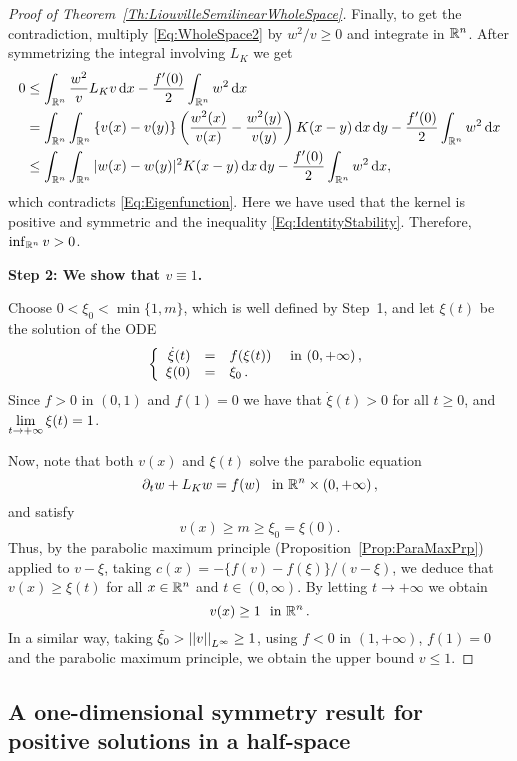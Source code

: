 \begin{proof}[Proof of Theorem~\ref{Th:LiouvilleSemilinearWholeSpace}]
Finally, to get the contradiction, multiply \eqref{Eq:WholeSpace2} by $w^2/v\geq 0$ and integrate in $\mathbb{R}^n$. After symmetrizing the integral involving $L_K$ we get
\begin{align*}
0 &\leq \int_{\mathbb{R}^n} \frac{w^2}{v}  L_K v \,\mathrm{d} x - \frac{f'(0)}{2}\int_{\mathbb{R}^n} w^2 \,\mathrm{d} x \\
&= \int_{\mathbb{R}^n}\int_{\mathbb{R}^n}\left\{ v(x)-v(y) \right\} \left( \frac{w^2(x)}{v(x)}-\frac{w^2(y)}{v(y)} \right) K(x-y) \,\mathrm{d} x \,\mathrm{d} y - \frac{f'(0)}{2}\int_{\mathbb{R}^n} w^2 \,\mathrm{d} x \\
&\leq \int_{\mathbb{R}^n}\int_{\mathbb{R}^n} |w(x)-w(y)|^2 K(x-y) \,\mathrm{d} x \,\mathrm{d} y - \frac{f'(0)}{2}\int_{\mathbb{R}^n} w^2 \,\mathrm{d} x ,
\end{align*}
which contradicts \eqref{Eq:Eigenfunction}. Here we have used that the kernel is positive and symmetric and the inequality \eqref{Eq:IdentityStability}. Therefore, $\inf_{\mathbb{R}^n} v >0$.

\textbf{Step 2: We show that $v\equiv 1$.}

Choose $0<\xi_0<\min\{1,m\}$, which is well defined by Step~1, and let $\xi(t)$ be the solution of the ODE
$$
\left\{\begin{array}{rcll}
\dot{\xi}(t) &=& f(\xi(t)) & \textrm{ in }(0,+\infty)\,,\\
\xi(0) &=& \xi_0\,.
\end{array} \right.
$$
Since $f>0$ in $(0,1)$ and $f(1) = 0$ we have that $\dot{\xi}(t)>0$ for all $t\geq 0$, and $\displaystyle \lim_{t\to +\infty} \xi(t) = 1$.

Now, note that both $v(x)$ and $\xi(t)$ solve the parabolic equation
$$ \partial_t w + L_K w = f(w) \,\,\, \textrm{ in }\mathbb{R}^n\times (0,+\infty)\,, $$
and satisfy
$$ v(x) \geq m \geq \xi_0 = \xi(0). $$
Thus, by the parabolic maximum principle (Proposition~\ref{Prop:ParaMaxPrp}) applied to $v-\xi$, taking $c(x) = -\{f(v)-f(\xi)\}/(v-\xi)$, we deduce that $v(x)\geq \xi(t)$ for all $x\in\mathbb{R}^n$ and $t\in(0,\infty)$. By letting $t \to +\infty$ we obtain
$$
 v(x) \geq 1 \,\, \textrm{ in }\mathbb{R}^n\,.  
$$
In a similar way, taking $\tilde{\xi}_0>\left | \left |{v} \right | \right |_{L^\infty} \geq 1$, using $f<0$ in $(1,+\infty)$, $f(1)=0$ and the parabolic maximum principle, we obtain the upper bound $v\leq 1$.
\end{proof}



\subsection{A one-dimensional symmetry result for positive solutions in a half-space}

